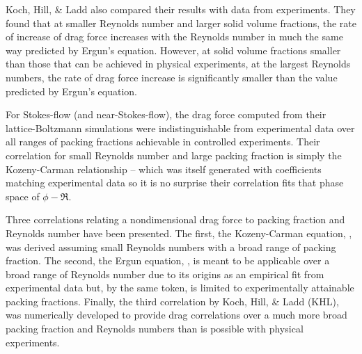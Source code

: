 Koch, Hill, \& Ladd\cite{Hill2001, Koch2001, Gruber2012, Benyahia2006} also compared their results with data from experiments. They found that at smaller Reynolds number and larger solid volume fractions, the rate of increase of drag force increases with the Reynolds number in much the same way predicted by Ergun’s equation. However, at solid volume fractions smaller than those that can be achieved in physical experiments, at the largest Reynolds numbers, the rate of drag force increase is significantly smaller than the value predicted by Ergun's equation.

For Stokes-flow (and near-Stokes-flow), the drag force computed from their lattice-Boltzmann simulations were indistinguishable from experimental data over all ranges of packing fractions achievable in controlled experiments. Their correlation for small Reynolds number and large packing fraction is simply the Kozeny-Carman relationship -- which was itself generated with coefficients matching experimental data so it is no surprise their correlation fits that phase space of $\phi-\Re$.


Three correlations relating a nondimensional drag force to packing fraction and Reynolds number have been presented. The first, the Kozeny-Carman equation, , was derived assuming small Reynolds numbers with a broad range of packing fraction. The second, the Ergun equation, , is meant to be applicable over a broad range of Reynolds number due to its origins as an empirical fit from experimental data but, by the same token, is limited to experimentally attainable packing fractions. Finally, the third correlation by Koch, Hill, \& Ladd (KHL),  was numerically developed to provide drag correlations over a much more broad packing fraction and Reynolds numbers than is possible with physical experiments. 

